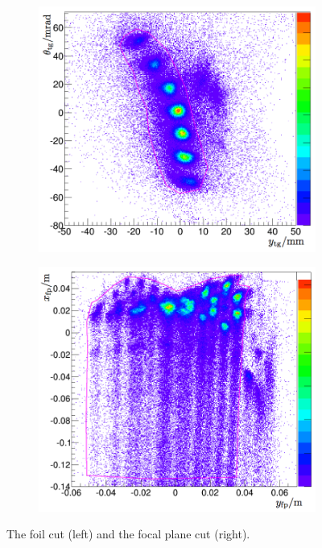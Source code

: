 \begin{figure}[b!]
  \centering
  \begin{subfigure}[t]{0.49\textwidth}
    \includegraphics[width=\textwidth]{figs/foil-cut.png}
  \end{subfigure}
  \begin{subfigure}[t]{0.49\textwidth}
    \includegraphics[width=\textwidth]{figs/focal-plane-cut.png}
  \end{subfigure}
  \caption[The foil cut and the focal plane cut.]{The foil cut (left) and the focal plane cut (right). \label{C6S3SS2F1}}
\end{figure}

